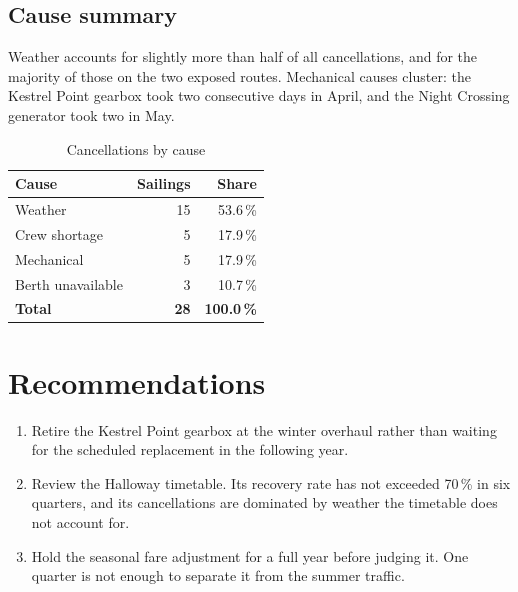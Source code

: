\documentclass[11pt,a4paper]{report}
\begin{document}
\section{Cause summary}

Weather accounts for slightly more than half of all cancellations, and for the
majority of those on the two exposed routes. Mechanical causes cluster: the
Kestrel Point gearbox took two consecutive days in April, and the Night Crossing
generator took two in May.

\begin{table}[ht]
  \centering
  \caption{Cancellations by cause}
  \label{tab:causes}
  \begin{tabular}{lrr}
    \toprule
    Cause & Sailings & Share \\
    \midrule
    Weather            & 15 & 53.6\,\% \\
    Crew shortage      &  5 & 17.9\,\% \\
    Mechanical         &  5 & 17.9\,\% \\
    Berth unavailable  &  3 & 10.7\,\% \\
    \midrule
    \textbf{Total}     & \textbf{28} & \textbf{100.0\,\%} \\
    \bottomrule
  \end{tabular}
\end{table}

\chapter{Recommendations}

\begin{enumerate}
  \item Retire the Kestrel Point gearbox at the winter overhaul rather than
        waiting for the scheduled replacement in the following year.
  \item Review the Halloway timetable. Its recovery rate has not exceeded
        70\,\% in six quarters, and its cancellations are dominated by weather
        the timetable does not account for.
  \item Hold the seasonal fare adjustment for a full year before judging it.
        One quarter is not enough to separate it from the summer traffic.
\end{enumerate}
\end{document}
